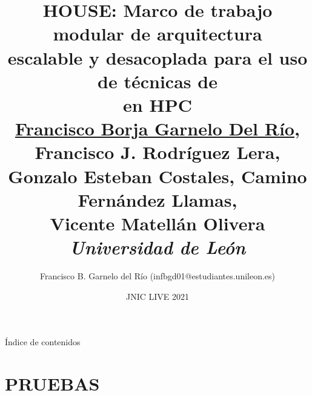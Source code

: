 \documentclass[aspectratio=169]{beamer}
\title[HOUSE]{%
HOUSE: Marco de trabajo modular de arquitectura\\%
escalable y desacoplada para el uso de técnicas de\\%
{\fz} en HPC\\%
\small{\underline{Francisco Borja Garnelo Del Río}, Francisco J. Rodríguez Lera,}\\
\small{Gonzalo Esteban Costales, Camino Fernández Llamas,}\\
\small{Vicente Matellán Olivera}\\
\small{\textit{Universidad de León}}
}
\author{Francisco B. Garnelo del Río (infbgd01@estudiantes.unileon.es)}
\date{JNIC LIVE 2021}
\begin{document}
\renewcommand{\contentsname}{Contenidos}
\renewcommand{\figurename}{Figura}
\renewcommand{\tablename}{Tabla}
\renewcommand{\sectionname}{Sección}
\renewcommand{\subsectionname}{Subsección}
\renewcommand{\partname}{Parte}

\titleframe

\begin{frame}[noframenumbering]{Índice de contenidos}
    \tableofcontents
\end{frame}
 
\iffalse %
\section{PRUEBAS}
\frame{\sectionpage}
\end{document}
